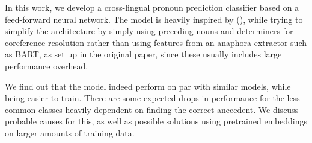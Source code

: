 \documentclass[11pt]{article}
\begin{document}
In this work, we develop a cross-lingual pronoun prediction classifier based on a feed-forward neural network.
The model is heavily inspired by (\cite{Hardmeier2013Latent}), while trying to simplify the architecture by simply using preceding nouns and determiners for coreference resolution rather than using features from an anaphora extractor such as BART, as set up in the original paper, since these usually includes large performance overhead.

We find out that the model indeed perform on par with similar models, while being easier to train.
There are some expected drops in performance for the less common classes heavily dependent on finding the correct anecedent.
We discuss probable causes for this, as well as possible solutions using pretrained embeddings on larger amounts of training data.

\printbibliography
\end{document}
